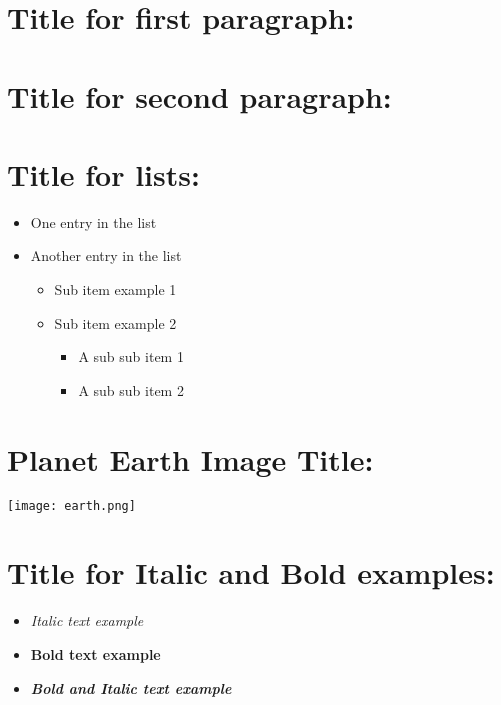 \documentclass[12pt]{article} %
\begin{document}
\section*{Title for first paragraph:}
\begin{flushleft}
\lipsum[1]
\end{flushleft}


\section*{Title for second paragraph:}
\begin{flushleft}
\lipsum[1]
\end{flushleft}


\newpage


\section*{Title for lists:}
\begin{flushleft}
\begin{itemize}
  \item One entry in the list
  \item Another entry in the list
  \begin{itemize}
  \item Sub item example 1
  \item Sub item example 2
  \begin{itemize}
  \item A sub sub item 1
  \item A sub sub item 2
  \end{itemize}
  \end{itemize}
\end{itemize}
\end{flushleft}


\newpage


\section*{Planet Earth Image Title:}
\begin{flushleft}
\texttt{[image: earth.png]} %
\end{flushleft}


\newpage


\section*{Title for Italic and Bold examples:}
\begin{flushleft}
\begin{itemize}
\item\textit{Italic text example}
\item\textbf{Bold text example}
\item\textit{\textbf{Bold and Italic text example}}
\end{itemize}
\end{flushleft}


\end{document}
